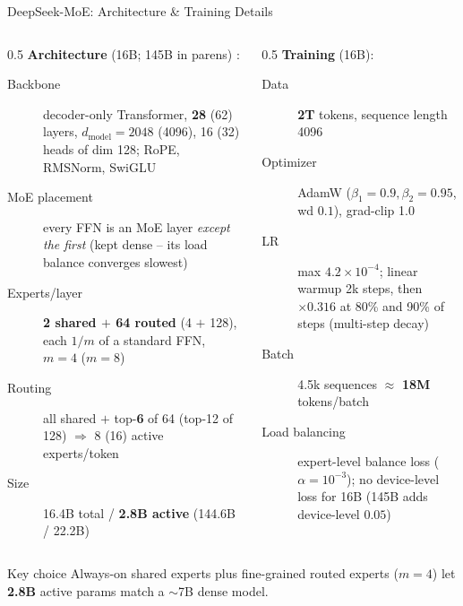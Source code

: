 \begin{frame}{DeepSeek-MoE: Architecture \& Training Details}

  \begin{columns}
    \begin{column}{0.5\textwidth}
      \textbf{Architecture} (16B; 145B in parens) \cite{dai2024deepseekmoe}:
      \begin{description}
        \item[Backbone] decoder-only Transformer, \textbf{28} (62) layers, $d_{\text{model}}{=}2048$ (4096), 16 (32) heads of dim 128; RoPE, RMSNorm, SwiGLU
        \item[MoE placement] every FFN is an MoE layer \emph{except the first} (kept dense -- its load balance converges slowest)
        \item[Experts/layer] \textbf{2 shared $+$ 64 routed} (4 $+$ 128), each $1/m$ of a standard FFN, $m{=}4$ ($m{=}8$)
        \item[Routing] all shared $+$ top-\textbf{6} of 64 (top-12 of 128) $\Rightarrow$ 8 (16) active experts/token
        \item[Size] 16.4B total / \textbf{2.8B active} (144.6B / 22.2B)
      \end{description}
    \end{column}
    \begin{column}{0.5\textwidth}
      \textbf{Training} (16B):
      \begin{description}
        \item[Data] \textbf{2T} tokens, sequence length 4096
        \item[Optimizer] AdamW ($\beta_1{=}0.9,\beta_2{=}0.95$, wd $0.1$), grad-clip 1.0
        \item[LR] max $4.2\times10^{-4}$; linear warmup 2k steps, then $\times0.316$ at 80\% and 90\% of steps (multi-step decay)
        \item[Batch] 4.5k sequences $\approx$ \textbf{18M} tokens/batch
        \item[Load balancing] expert-level balance loss ($\alpha{=}10^{-3}$); no device-level loss for 16B (145B adds device-level $0.05$)
      \end{description}
    \end{column}
  \end{columns}

  \vspace{0.3em}
  \begin{block}{Key choice}
    Always-on shared experts plus fine-grained routed experts ($m{=}4$) let \textbf{2.8B} active params match a $\sim$7B dense model.
  \end{block}
\end{frame}

